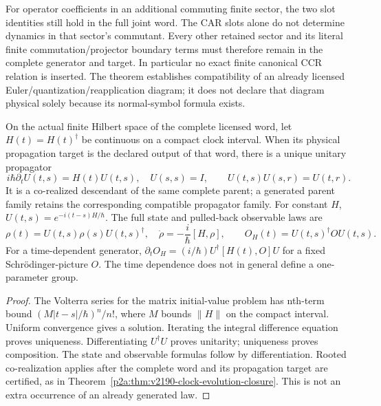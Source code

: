 \documentclass[12pt,a4paper]{article}
\begin{document}
For operator coefficients in an additional commuting finite sector, the
two slot identities still hold in the full joint word.  The CAR slots alone
do not determine dynamics in that sector's commutant.  Every other retained
sector and its literal finite commutation/projector boundary terms must
therefore remain in the complete generator and target.  In particular no
exact finite canonical CCR relation is inserted.  The theorem establishes
compatibility of an already licensed Euler/quantization/reapplication
diagram; it does not declare that diagram physical solely because its
normal-symbol formula exists.

\begin{theorem}
\label{p4:thm:v2190-complete-finite-propagator}
On the actual finite Hilbert space of the complete licensed word, let
\(H(t)=H(t)^\dagger\) be continuous on a compact clock interval.  When
its physical propagation target is the declared output of that word,
there is a unique unitary propagator
\[
 i\hbar\partial_tU(t,s)=H(t)U(t,s),\quad U(s,s)=I,
 \qquad U(t,s)U(s,r)=U(t,r).
\]
It is a co-realized descendant of the same complete parent; a generated
parent family retains the corresponding compatible propagator family.
For constant \(H\), \(U(t,s)=e^{-i(t-s)H/\hbar}\).  The full state and
pulled-back observable laws are
\[
 \rho(t)=U(t,s)\rho(s)U(t,s)^\dagger,
 \quad\dot\rho=-\frac{i}{\hbar}[H,\rho],
 \qquad O_H(t)=U(t,s)^\dagger O U(t,s).
\]
For a time-dependent generator,
\(\partial_tO_H=(i/\hbar)U^\dagger[H(t),O]U\) for a fixed
Schr\"odinger-picture \(O\).  The time dependence does not in general
define a one-parameter group.
\end{theorem}
\begin{proof}
The Volterra series for the matrix initial-value problem has nth-term
bound \((M|t-s|/\hbar)^n/n!\), where \(M\) bounds \(\|H\|\) on the
compact interval.  Uniform convergence gives a solution.  Iterating the
integral difference equation proves uniqueness.  Differentiating
\(U^\dagger U\) proves unitarity; uniqueness proves composition.  The
state and observable formulas follow by differentiation.  Rooted
co-realization applies after the complete word and its propagation target
are certified, as in Theorem~\ref{p2a:thm:v2190-clock-evolution-closure}.
This is not an extra occurrence of an already generated law.
\end{proof}
\end{document}

